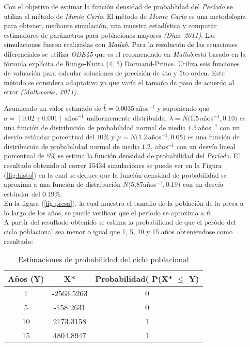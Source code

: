 \documentclass{SPANISH_acm_proc_article-sp}
\begin{document}
\label{sec:estimacion}
Con el objetivo de estimar la funci\'on densidad de probablidad del \emph{Per\'iodo}
se utiliza el m\'etodo de \textit{Monte Carlo}. El m\'etodo de \textit{Monte Carlo} es una metodolog\'ia
para obtener, mediante simulaci\'on, una muestra estad\'istica y computar estimadores
de par\'ametros para poblaciones mayores \textit{(Diaz, 2011)}. Las simulaciones fueron
realizadas con \textit{Matlab}. Para la resoluci\'on de las ecuaciones diferenciales se
 utiliza \textit{ODE45} que es el recomendado en
\textit{Matlab},est\'a basado en la f\'ormula expl\'icita de Runge-Kutta (4, 5) Dormand-Prince. Utiliza seis
funciones de valuaci\'on para calcular soluciones de precisi\'on de 4to y 5to orden. Este m\'etodo se considera
adaptativo ya que var\'ia el tama\~no de paso de acuerdo al error \textit{(Mathworks, 2011)}.

Asumiendo un valor estimado de $ \hat b = 0.0035 \, $a\~nos$^{-1} $ y suponiendo que
$ a = (0.02 \, \underline{+} \, 0.001) \, $a\~nos$^{-1}$ uniformemente distribuida,
$ \lambda = N(1.5 \, $a\~nos$^{-1}, 0.10) $ es una funci\'on de distribuci\'on de probabilidad normal de media
$ 1.5 \, $a\~nos$^{-1} $ con un desv\'io est\'andar porcentual del $ 10\% $ y
$ \mu = N(1.2 \, $a\~nos$^{-1}, 0.05) $ es una funci\'on de distribuci\'on de probabilidad normal de media $ 1.2$, a\~nos$^{-1}$ con un desv\'io lineal porcentual de $5\%$ se estima
la funci\'on densidad de probabilidad del \emph{Per\'iodo}. El resultado obtenido al correr
15434 simulaciones se puede ver en la Figura (\ref{fig:histo}) en la cual se deduce que la funci\'on densidad de probabilidad se aproxima a una funci\'on de distribuci\'on $N(5.87$a\~nos$^{-1}, 0.19)$ con un desv\'io est\'andar del 0.19\%.\\

En la figura (\ref{fig:presa}), la cual muestra el tama\~no de la poblaci\'on de la presa a lo largo de los a\~nos, se puede verificar que el per\'iodo se aproxima a \textit{6}.
\\
A partir del resultado obtenido se estima la probabilidad de que el per\'odo del ciclo
poblacional sea menor o igual que 1, 5, 10 y 15 a\~nos obteniendose como resultado:

\begin{table}

\begin{tabular}{|c|c|c|}
	\hline
	A\~nos (Y) 	& 		X*		&		Probabilidad( P(X* $\leq$ Y)		\\
	\hline \hline
	1				&	-2563.5263	&	0 \\
	\hline
	5				&		-458.2631 & 0 \\
	\hline
	10		&	2173.3158 & 1 \\
	\hline
	15		& 4804.8947 & 1 \\
	\hline
\end{tabular}
	\caption{Estimaciones de probabilidad del ciclo poblacional}
\end{table}
\end{document}
